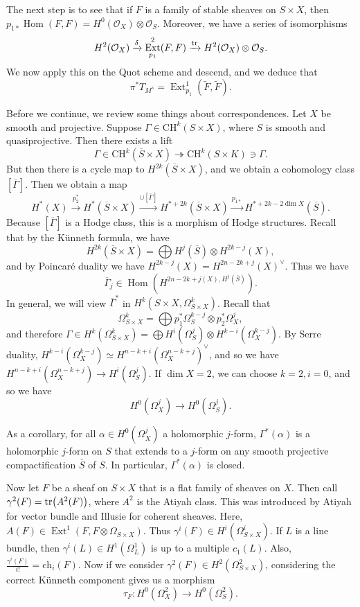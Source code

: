 \documentclass[leqno, openany]{memoir}
\theoremstyle{definition}
\theoremstyle{remark}
\theoremstyle{plain}
\theoremstyle{definition}
\theoremstyle{remark}
\newcommand{\mc}[1]{\mathcal{#1}}
\newcommand{\mr}[1]{\mathrm{#1}}
\newcommand{\ol}[1]{\overline{#1}}
\newcommand{\wt}[1]{\widetilde{#1}}
\DeclareMathOperator{\Hom}{Hom}
\DeclareMathOperator{\Ext}{Ext}
\begin{document}
The next step is to see that if $F$ is a family of stable sheaves on $S \times X$, then $p_{1*} \Hom(F, F) = H^0(\mc{O}_X) \otimes \mc{O}_S$. Moreover, we have a series of isomorphisms
\[ H^2(\mc{O}_X) \xrightarrow{\delta} \Ext^2_{p_1}(F, F) \xrightarrow{\tr} H^2(\mc{O}_X) \otimes \mc{O}_S. \]
We now apply this on the Quot scheme and descend, and we deduce that
\[ \pi^* T_{M^s} = \Ext^1_{p_1}(\wt{F}, \wt{F}). \]

Before we continue, we review some things about correspondences. Let $X$ be smooth and projective. Suppose $\Gamma \in \mr{CH}^k(S \times X)$, where $S$ is smooth and quasiprojective. Then there exists a lift
\[ \Gamma \in \mr{CH}^k(\ol{S} \times X) \twoheadrightarrow \mr{CH}^k(S \times K) \ni \Gamma. \]
But then there is a cycle map to $H^{2k}(\ol{S} \times X)$, and we obtain a cohomology class $[\ol{\Gamma}]$. Then we obtain a map
\[ H^*(X) \xrightarrow{p_2^*} H^*(\ol{S} \times X) \xrightarrow{\cup [\ol{\Gamma}]} H^{*+2k}(\ol{S} \times X) \xrightarrow{p_{1*}} H^{*+2k-2\dim X}(\ol{S}). \]
Because $[\ol{\Gamma}]$ is a Hodge class, this is a morphism of Hodge structures. Recall that by the K\"unneth formula, we have
\[ H^{2k}(\ol{S} \times X) = \bigoplus H^j(\ol{S}) \otimes H^{2k-j}(X), \]
and by Poincar\'e duality we have $H^{2k-j}(X) = H^{2n-2k+j}(X)^{\vee}$. Thus we have 
\[ \ol{\Gamma}_j \in \Hom(H^{2n-2k+j(X), H^j(\ol{S})}). \]
In general, we will view $\ol{\Gamma}^*$ in $H^k(S \times X, \Omega^k_{S \times X})$. Recall that
\[ \Omega^k_{S \times X} = \bigoplus p_1^* \Omega_S^{k-j} \otimes p_2^* \Omega_X^j, \]
and therefore $\Gamma \in H^k(\Omega^k_{S \times X}) = \bigoplus H^i(\Omega^j_S) \otimes H^{k-i}(\Omega^{k-j}_X)$. By Serre duality, $H^{k-i}(\Omega_X^{k-j}) \simeq H^{n-k+i}(\Omega_X^{n-k+j})^{\vee}$, and so we have $H^{n-k+i}(\Omega_X^{n-k+j}) \to H^i(\Omega_S^j)$. If $\dim X = 2$, we can choose $k=2, i=0$, and so we have
\[ H^0(\Omega_X^j) \to H^0(\Omega_S^j). \]

As a corollary, for all $\alpha \in H^0(\Omega_X^j)$ a holomorphic $j$-form, $\Gamma^*(\alpha)$ is a holomorphic $j$-form on $S$ that extends to a $j$-form on any smooth projective compactification $\ol{S}$ of $S$. In particular, $\Gamma^* (\alpha)$ is closed.

Now let $F$ be a sheaf on $S \times X$ that is a flat family of sheaves on $X$. Then call $\gamma^2(F) = \tr (A^2(F))$, where $A^2$ is the Atiyah class. This was introduced by Atiyah for vector bundle and Illusie for coherent sheaves. Here, $A(F) \in \Ext^1(F, F \otimes \Omega_{S \times X})$. Thus $\gamma^i(F) \in H^i(\Omega^i_{S \times X})$. If $L$ is a line bundle, then $\gamma^i(L) \in H^1(\Omega^1_L)$ is up to a multiple $c_1(L)$. Also, $\frac{\gamma^i(F)}{i!} = \mr{ch}_i(F)$. Now if we consider $\gamma^2(F) \in H^2(\Omega^2_{S \times X})$, considering the correct K\"unneth component gives us a morphism
\[ \tau_F \colon H^0(\Omega^2_X) \to H^0(\Omega^2_S). \]
\end{document}
